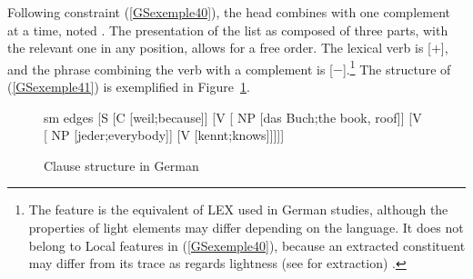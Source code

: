 \documentclass[output=paper
                ,modfonts
                ,nonflat
	        ,collection
	        ,collectionchapter
	        ,collectiontoclongg
 	        ,biblatex
                ,babelshorthands
                ,newtxmath
                ,draftmode
                ,colorlinks, citecolor=brown
]{./langsci/langscibook}
\begin{document}
{\begin{exe}
\end{exe}

Following constraint (\ref{GSexemple40}), the head combines with one complement at a time, noted . The presentation of the list as composed of three parts, with the relevant one in any position, allows for a free order. The lexical verb is [\light $+$], and the phrase combining the verb with a complement is [\light $-$].\footnote{The feature \light is the equivalent of LEX used in German studies, although the properties of light elements may differ depending on the language. It does not belong to Local features in (\ref{GSexemple40}), because an extracted constituent may differ from its trace as regards lightness (see  for extraction) \citep{muller2018clause}.} The structure of (\ref{GSexemple41}) is exemplified in Figure~\ref{GSfigure10}.


\z


\begin{figure}
    \centering
	\begin{forest}
	sm edges
 	[S 
    [C [weil;because]]
    [V  
        [ NP [das Buch;the book, roof]]    
        [V  
            [ NP [jeder;everybody]]
            [V  [kennt;knows]]]]]
\end{forest}
    \caption{Clause structure in German}
    \label{GSfigure10}
\end{figure}


}
\end{document}
